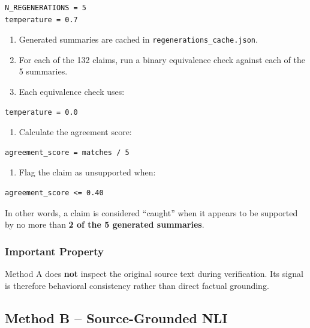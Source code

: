 \documentclass[11pt,a4paper]{article}
\begin{document}
\begin{lstlisting}
N_REGENERATIONS = 5
temperature = 0.7
\end{lstlisting}

\begin{enumerate}[resume]
    \item Generated summaries are cached in \texttt{regenerations\_cache.json}.
    \item For each of the 132 claims, run a binary equivalence check against each of the 5 summaries.
    \item Each equivalence check uses:
\end{enumerate}

\begin{lstlisting}
temperature = 0.0
\end{lstlisting}

\begin{enumerate}[resume]
    \item Calculate the agreement score:
\end{enumerate}

\begin{lstlisting}
agreement_score = matches / 5
\end{lstlisting}

\begin{enumerate}[resume]
    \item Flag the claim as unsupported when:
\end{enumerate}

\begin{lstlisting}
agreement_score <= 0.40
\end{lstlisting}

In other words, a claim is considered ``caught'' when it appears to be supported by no more than \textbf{2 of the 5 generated summaries}.

\subsubsection{Important Property}

Method A does \textbf{not} inspect the original source text during verification. Its signal is therefore behavioral consistency rather than direct factual grounding.


\subsection{Method B -- Source-Grounded NLI}
\end{document}
